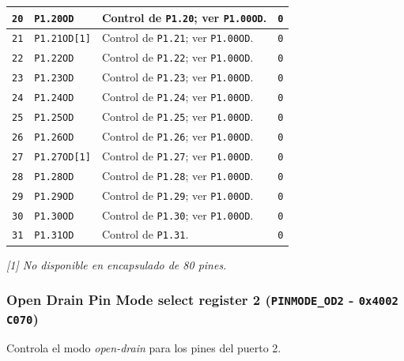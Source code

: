 \begin{longtable}{|>{\raggedright\arraybackslash}p{}|>{\raggedright\arraybackslash}p{}|>{\raggedright\arraybackslash}p{}|>{\centering\arraybackslash}p{}|}
\hline
\texttt{20} & \texttt{P1.20OD} & Control de \texttt{P1.20}; ver \texttt{P1.00OD}. & \texttt{0} \\
\hline
\texttt{21} & \texttt{P1.21OD[1]} & Control de \texttt{P1.21}; ver \texttt{P1.00OD}. & \texttt{0} \\
\hline
\texttt{22} & \texttt{P1.22OD} & Control de \texttt{P1.22}; ver \texttt{P1.00OD}. & \texttt{0} \\
\hline
\texttt{23} & \texttt{P1.23OD} & Control de \texttt{P1.23}; ver \texttt{P1.00OD}. & \texttt{0} \\
\hline
\texttt{24} & \texttt{P1.24OD} & Control de \texttt{P1.24}; ver \texttt{P1.00OD}. & \texttt{0} \\
\hline
\texttt{25} & \texttt{P1.25OD} & Control de \texttt{P1.25}; ver \texttt{P1.00OD}. & \texttt{0} \\
\hline
\texttt{26} & \texttt{P1.26OD} & Control de \texttt{P1.26}; ver \texttt{P1.00OD}. & \texttt{0} \\
\hline
\texttt{27} & \texttt{P1.27OD[1]} & Control de \texttt{P1.27}; ver \texttt{P1.00OD}. & \texttt{0} \\
\hline
\texttt{28} & \texttt{P1.28OD} & Control de \texttt{P1.28}; ver \texttt{P1.00OD}. & \texttt{0} \\
\hline
\texttt{29} & \texttt{P1.29OD} & Control de \texttt{P1.29}; ver \texttt{P1.00OD}. & \texttt{0} \\
\hline
\texttt{30} & \texttt{P1.30OD} & Control de \texttt{P1.30}; ver \texttt{P1.00OD}. & \texttt{0} \\
\hline
\texttt{31} & \texttt{P1.31OD} & Control de \texttt{P1.31}. & \texttt{0} \\
\hline
\end{longtable}
\noindent\textit{[1] No disponible en encapsulado de 80 pines.}

\subsubsection{Open Drain Pin Mode select register 2 (\texttt{PINMODE\_OD2} - \texttt{0x4002 C070})}
Controla el modo \textit{open-drain} para los pines del puerto 2.

